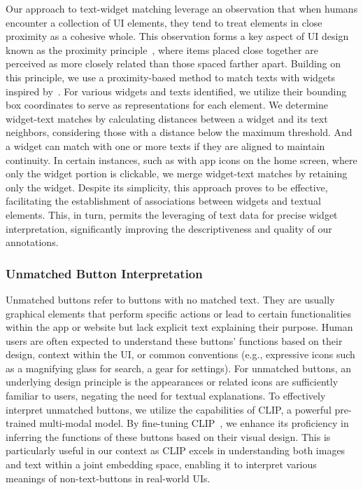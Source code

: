 Our approach to text-widget matching leverage an observation that when humans encounter a collection of UI elements, they tend to treat elements in close proximity as a cohesive whole. This observation forms a key aspect of UI design known as the proximity principle~\cite{wertheimer1938laws}, where items placed close together are perceived as more closely related than those spaced farther apart.
Building on this principle, we use a proximity-based method to match texts with widgets inspired by~\cite{xie2022psychologically}. For various widgets and texts identified, we utilize their bounding box coordinates to serve as representations for each element. We determine widget-text matches by calculating distances between a widget and its text neighbors, considering those with a distance below the maximum threshold. And a widget can match with one or more texts if they are aligned to maintain continuity. In certain instances, such as with app icons on the home screen, where only the widget portion is clickable, we merge widget-text matches by retaining only the widget. Despite its simplicity, this approach proves to be effective, facilitating the establishment of associations between widgets and textual elements. This, in turn, permits the leveraging of text data for precise widget interpretation, significantly improving the descriptiveness and quality of our annotations.

\subsubsection{Unmatched Button Interpretation}

Unmatched buttons refer to buttons with no matched text. They are usually graphical elements that perform specific actions or lead to certain functionalities within the app or website but lack explicit text explaining their purpose. Human users are often expected to understand these buttons' functions based on their design, context within the UI, or common conventions (e.g., expressive icons such as a magnifying glass for search, a gear for settings). For unmatched buttons, an underlying design principle is the appearances or related icons are sufficiently familiar to users, negating the need for textual explanations. To effectively interpret unmatched buttons, we utilize the capabilities of CLIP, a powerful pre-trained multi-modal model. By fine-tuning CLIP~\cite{radford2021learning}, we enhance its proficiency in inferring the functions of these buttons based on their visual design. This is particularly useful in our context as CLIP excels in understanding both images and text within a joint embedding space, enabling it to interpret various meanings of non-text-buttons in real-world UIs.

